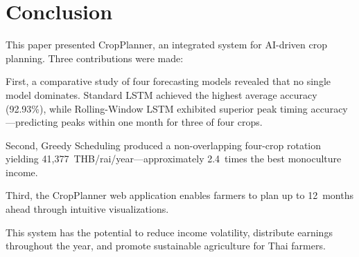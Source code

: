 \documentclass[conference]{IEEEtran}
\begin{document}
\section{Conclusion}

This paper presented CropPlanner, an integrated system for AI-driven crop planning. Three contributions were made:

First, a comparative study of four forecasting models revealed that no single model dominates. Standard LSTM achieved the highest average accuracy (92.93\%), while Rolling-Window LSTM exhibited superior peak timing accuracy---predicting peaks within one month for three of four crops.

Second, Greedy Scheduling produced a non-overlapping four-crop rotation yielding 41,377~THB/rai/year---approximately 2.4~times the best monoculture income.

Third, the CropPlanner web application enables farmers to plan up to 12~months ahead through intuitive visualizations.

This system has the potential to reduce income volatility, distribute earnings throughout the year, and promote sustainable agriculture for Thai farmers.
\end{document}
